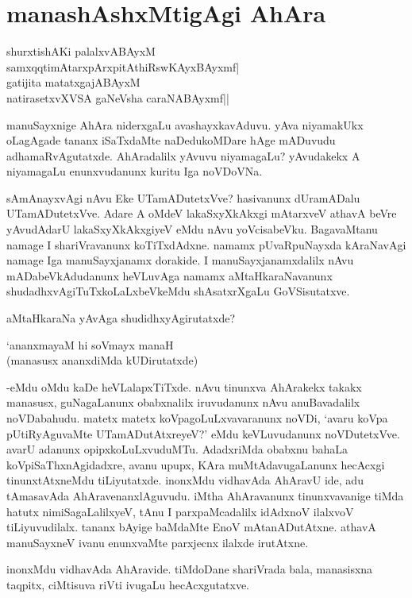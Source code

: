 \chapter{manashAshxMtigAgi AhAra}

\begin{shloka}
shurxtishAKi palalxvABAyxM\\
samxqqtimAtarxpArxpitAthiRswKAyxBAyxmf|\\
gatijita matatxgajABAyxM\\
natirasetxvXVSA gaNeVsha caraNABAyxmf||
\end{shloka}

manuSayxnige AhAra niderxgaLu avashayxkavAduvu. yAva niyamakUkx oLagAgade tananx iSaTxdaMte naDedukoMDare hAge mADuvudu adhamaRvAgutatxde. AhAradalilx yAvuvu niyamagaLu? yAvudakekx A niyamagaLu enunxvudanunx kuritu Iga noVDoVNa.

sAmAnayxvAgi nAvu Eke UTamADutetxVve? hasivanunx dUramADalu UTamADutetxVve. Adare A oMdeV lakaSxyXkAkxgi mAtarxveV athavA beVre yAvudAdarU lakaSxyXkAkxgiyeV eMdu nAvu yoVcisabeVku. BagavaMtanu namage I shariVravanunx koTiTxdAdxne. namamx pUvaRpuNayxda kAraNavAgi namage Iga manuSayxjanamx dorakide. I manuSayxjanamxdalilx nAvu mADabeVkAdudanunx heVLuvAga namamx aMtaHkaraNavanunx shudadhxvAgiTuTxkoLaLxbeVkeMdu shAsatxrXgaLu GoVSisutatxve.

aMtaHkaraNa yAvAga shudidhxyAgirutatxde?

\begin{shloka}
`ananxmayaM hi soVmayx manaH\\
(manasusx ananxdiMda kUDirutatxde)
\end{shloka}

-eMdu oMdu kaDe heVLalapxTiTxde. nAvu tinunxva AhArakekx takakx manasusx, guNagaLanunx obabxnalilx iruvudanunx nAvu anuBavadalilx noVDabahudu. matetx matetx koVpagoLuLxvavaranunx noVDi, `avaru koVpa pUtiRyAguvaMte UTamADutAtxreyeV?' eMdu keVLuvudanunx noVDutetxVve. avarU adanunx opipxkoLuLxvuduMTu. AdadxriMda obabxnu bahaLa koVpiSaThxnAgidadxre, avanu upupx, KAra muMtAdavugaLanunx hecAcxgi tinunxtAtxneMdu tiLiyutatxde. inonxMdu vidhavAda AhAravU ide, adu tAmasavAda AhAravenanxlAguvudu. iMtha AhAravanunx tinunxvavanige tiMda hatutx nimiSagaLalilxyeV, tAnu I parxpaMcadalilx idAdxnoV ilalxvoV tiLiyuvudilalx. tananx bAyige baMdaMte EnoV mAtanADutAtxne. athavA manuSayxneV ivanu enunxvaMte parxjecnx ilalxde irutAtxne.

inonxMdu vidhavAda AhAravide. tiMdoDane shariVrada bala, manasisxna taqpitx, ciMtisuva riVti ivugaLu hecAcxgutatxve.

